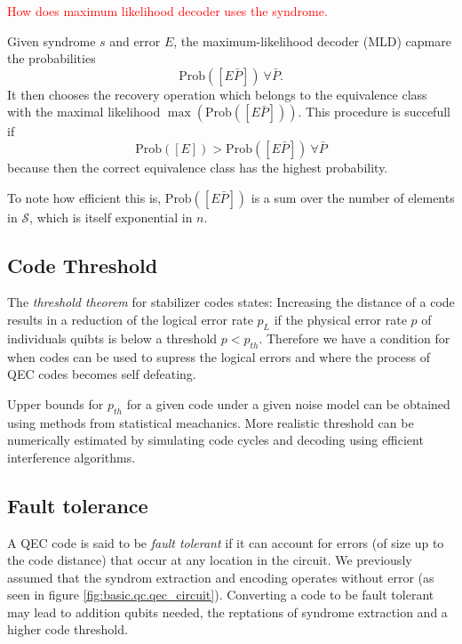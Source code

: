 \textcolor{red}{How does maximum likelihood decoder uses the syndrome.}

Given syndrome $s$ and error $E$, the maximum-likelihood decoder (MLD) capmare the probabilities 
\begin{equation}
    \text{Prob}([E\bar{P}])\ \forall \bar{P}.
\end{equation}
It then chooses the recovery operation which belongs to the equivalence class with the maximal likelihood $\max(\text{Prob}([E\bar{P}]))$.
This procedure is succefull if 
\begin{equation}
     \text{Prob}([E])>\text{Prob}([E\bar{P}])\ \forall \bar{P}
\end{equation}
because then the correct equivalence class has the highest probability. \cite{QECmemory}

To note how efficient this is, $\text{Prob}([E\bar{P}])$ is a sum over the number of elements in $\mathcal{S}$, which is itself exponential in $n$. \cite{QECmemory}


\subsection{Code Threshold}
The \textit{threshold theorem} for stabilizer codes states:
Increasing the distance of a code results in a reduction of the logical error rate $p_L$ 
if the physical error rate $p$ of individuals quibts is below a threshold $p<p_{th}$.
Therefore we have a condition for when codes can be used to supress the logical errors and where the process of QEC codes becomes self defeating. \cite{QECintro}

Upper bounds for $p_{th}$ for a given code under a given noise model can be obtained using methods from statistical meachanics.
More realistic threshold can be numerically estimated by simulating code cycles and decoding using efficient interference algorithms. \cite{QECintro}


\subsection{Fault tolerance}
A QEC code is said to be \textit{fault tolerant} if it can account for errors (of size up to the code distance) that occur at any location in the circuit.
We previously assumed that the syndrom extraction and encoding operates without error (as seen in figure \ref{fig:basic.qc.qec_circuit}).
Converting a code to be fault tolerant may lead to addition qubits needed, the reptations of syndrome extraction and a higher code threshold. \cite{QECintro}


